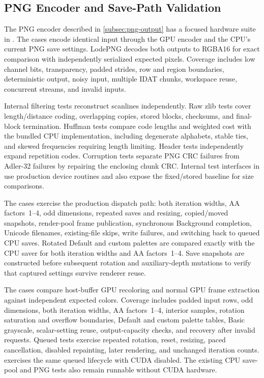 \subsection{PNG Encoder and Save-Path Validation}
\label{subsec:png-validation}

The PNG encoder described in \cref{subsec:png-output} has a focused
hardware suite in . The 
cases encode identical input through the GPU encoder and the CPU's
current PNG save settings. LodePNG decodes
both outputs to RGBA16 for exact comparison with independently
serialized expected pixels. Coverage includes low channel bits,
transparency, padded strides, row and region boundaries, deterministic
output, noisy input, multiple IDAT chunks, workspace reuse, concurrent
streams, and invalid inputs.

Internal filtering tests reconstruct scanlines independently. Raw zlib
tests cover length/distance coding, overlapping copies, stored blocks,
checksums, and final-block termination. Huffman tests compare code
lengths and weighted cost with the bundled CPU implementation, including
degenerate alphabets, stable ties, and skewed frequencies requiring
length limiting. Header tests independently expand repetition codes.
Corruption tests separate PNG CRC failures from Adler-32 failures by
repairing the enclosing chunk CRC. Internal test interfaces in
 use production device routines and
also expose the fixed/stored baseline for size comparisons.

The  cases exercise the production dispatch path:
both iteration widths, AA factors~1--4, odd dimensions, repeated saves
and resizing, copied/moved snapshots, render-pool frame publication,
synchronous Background completion, Unicode filenames, existing-file
skips, write failures, and switching back to queued CPU saves. Rotated
Default and custom palettes are compared exactly with the CPU saver for
both iteration widths and AA factors~1--4. Save snapshots are constructed
before subsequent rotation and auxiliary-depth mutations to verify that
captured settings survive renderer reuse.

The  cases compare host-buffer GPU recoloring and
normal GPU frame extraction against independent expected colors. Coverage
includes padded input rows, odd dimensions, both iteration widths, AA
factors~1--4, interior samples, rotation saturation and overflow boundaries,
Default and custom palette tables, Basic grayscale, scalar-setting reuse,
output-capacity checks, and recovery after invalid requests. Queued tests
exercise repeated rotation, reset, resizing, paced cancellation, disabled
repainting, later rendering, and unchanged iteration counts.
 exercises the same queued
lifecycle with CUDA disabled. The existing CPU save-pool and PNG tests
also remain runnable without CUDA hardware.

